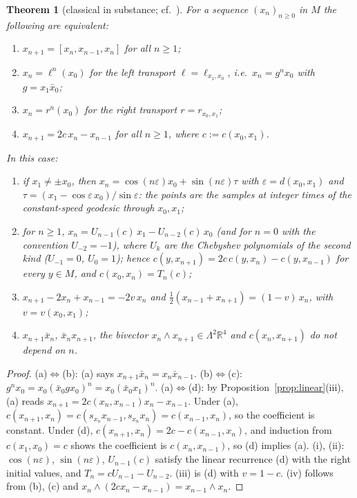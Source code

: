 \documentclass[11pt,reqno]{amsart}
\newtheorem{theorem}{Theorem}[section]
\theoremstyle{definition}
\theoremstyle{remark}
\numberwithin{equation}{section}
\newcommand{\R}{\mathbb{R}}
\newcommand{\hp}[3]{[#1,#2,#3]}
\begin{document}
\begin{theorem}[classical in substance; cf.\ \cite{Loos,MH}]\label{thm:recur}
For a sequence $(x_n)_{n\ge0}$ in $M$ the following are equivalent:
\begin{enumerate}[label=(\alph*)]
\item $x_{n+1}=\hp{x_n}{x_{n-1}}{x_n}$ for all $n\ge1$;
\item $x_n=\ell^n(x_0)$ for the left transport $\ell=\ell_{x_1,x_0}$, i.e.\ $x_n=g^nx_0$ with $g=x_1\bar x_0$;
\item $x_n=r^n(x_0)$ for the right transport $r=r_{x_0,x_1}$;
\item $x_{n+1}=2c\,x_n-x_{n-1}$ for all $n\ge1$, where $c:=c(x_0,x_1)$.
\end{enumerate}
In this case:
\begin{enumerate}[label=(\roman*)]
\item if $x_1\ne\pm x_0$, then $x_n=\cos(n\varepsilon)x_0+\sin(n\varepsilon)\tau$ with
$\varepsilon=d(x_0,x_1)$ and $\tau=(x_1-\cos\varepsilon\,x_0)/\sin\varepsilon$: the points are the samples at
integer times of the constant-speed geodesic through $x_0,x_1$;
\item for $n\ge1$, $x_n=U_{n-1}(c)\,x_1-U_{n-2}(c)\,x_0$ (and for $n=0$ with the convention $U_{-2}=-1$), where $U_k$ are the
Chebyshev polynomials of the second kind
($U_{-1}=0$, $U_0=1$); hence $c(y,x_{n+1})=2c\,c(y,x_n)-c(y,x_{n-1})$ for every $y\in M$, and
$c(x_0,x_n)=T_n(c)$;
\item $x_{n+1}-2x_n+x_{n-1}=-2v\,x_n$ and $\tfrac12(x_{n-1}+x_{n+1})=(1-v)\,x_n$, with $v=v(x_0,x_1)$;
\item $x_{n+1}\bar x_n$, $\bar x_nx_{n+1}$, the bivector $x_n\wedge x_{n+1}\in\Lambda^2\R^4$ and
$c(x_n,x_{n+1})$ do not depend on $n$.
\end{enumerate}
\end{theorem}
\begin{proof}
(a)$\Leftrightarrow$(b): (a) says $x_{n+1}\bar x_n=x_n\bar x_{n-1}$.  (b)$\Leftrightarrow$(c):
$g^nx_0=x_0(\bar x_0gx_0)^n=x_0(\bar x_0x_1)^n$.  (a)$\Leftrightarrow$(d): by
Proposition~\ref{prop:linear}(iii), (a) reads $x_{n+1}=2c(x_n,x_{n-1})x_n-x_{n-1}$.  Under (a),
$c(x_{n+1},x_n)=c(s_{x_n}x_{n-1},s_{x_n}x_n)=c(x_{n-1},x_n)$, so the coefficient is constant.  Under (d),
$c(x_{n+1},x_n)=2c-c(x_{n-1},x_n)$, and induction from $c(x_1,x_0)=c$ shows the coefficient is $c(x_n,x_{n-1})$,
so (d) implies (a).  (i), (ii): $\cos(n\varepsilon)$, $\sin(n\varepsilon)$, $U_{n-1}(c)$ satisfy the linear
recurrence (d) with the right initial values, and $T_n=cU_{n-1}-U_{n-2}$.  (iii) is (d) with $v=1-c$.  (iv)
follows from (b), (c) and $x_n\wedge(2cx_n-x_{n-1})=x_{n-1}\wedge x_n$.
\end{proof}
\end{document}
